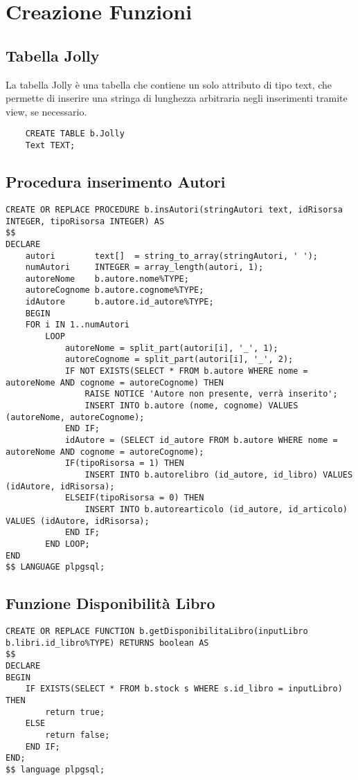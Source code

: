 \section{Creazione Funzioni}

\subsection{Tabella Jolly}
La tabella Jolly è una tabella che contiene un solo attributo di tipo text, che permette di
inserire una stringa di lunghezza arbitraria negli inserimenti tramite view, se necessario.
\begin{lstlisting}
    CREATE TABLE b.Jolly
    Text TEXT;
\end{lstlisting}

\subsection{Procedura inserimento Autori}
\begin{lstlisting}
CREATE OR REPLACE PROCEDURE b.insAutori(stringAutori text, idRisorsa INTEGER, tipoRisorsa INTEGER) AS
$$
DECLARE
    autori        text[]  = string_to_array(stringAutori, ' ');
    numAutori     INTEGER = array_length(autori, 1);
    autoreNome    b.autore.nome%TYPE;
    autoreCognome b.autore.cognome%TYPE;
    idAutore      b.autore.id_autore%TYPE;
    BEGIN
    FOR i IN 1..numAutori
        LOOP
            autoreNome = split_part(autori[i], '_', 1);
            autoreCognome = split_part(autori[i], '_', 2);
            IF NOT EXISTS(SELECT * FROM b.autore WHERE nome = autoreNome AND cognome = autoreCognome) THEN
                RAISE NOTICE 'Autore non presente, verrà inserito';
                INSERT INTO b.autore (nome, cognome) VALUES (autoreNome, autoreCognome);
            END IF;
            idAutore = (SELECT id_autore FROM b.autore WHERE nome = autoreNome AND cognome = autoreCognome);
            IF(tipoRisorsa = 1) THEN
                INSERT INTO b.autorelibro (id_autore, id_libro) VALUES (idAutore, idRisorsa);
            ELSEIF(tipoRisorsa = 0) THEN
                INSERT INTO b.autorearticolo (id_autore, id_articolo) VALUES (idAutore, idRisorsa);
            END IF;
        END LOOP;
END
$$ LANGUAGE plpgsql;
\end{lstlisting}

\subsection{Funzione Disponibilità Libro}
\begin{lstlisting}
CREATE OR REPLACE FUNCTION b.getDisponibilitaLibro(inputLibro b.libri.id_libro%TYPE) RETURNS boolean AS
$$
DECLARE
BEGIN
    IF EXISTS(SELECT * FROM b.stock s WHERE s.id_libro = inputLibro) THEN
        return true;
    ELSE
        return false;
    END IF;
END;
$$ language plpgsql;
\end{lstlisting}

